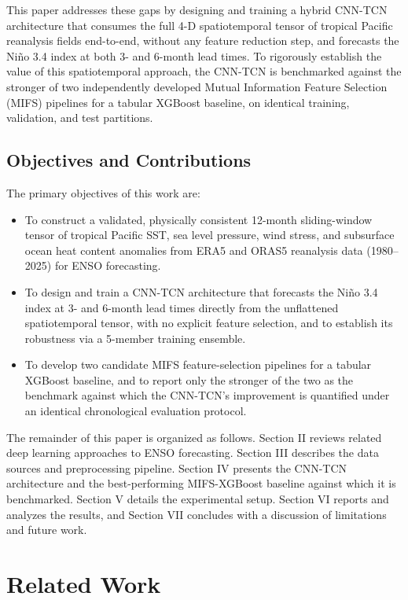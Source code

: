 \documentclass[conference]{IEEEtran}
\begin{document}
This paper addresses these gaps by designing and training a hybrid CNN-TCN architecture that consumes the full 4-D spatiotemporal tensor of tropical Pacific reanalysis fields end-to-end, without any feature reduction step, and forecasts the Ni\~no 3.4 index at both 3- and 6-month lead times. To rigorously establish the value of this spatiotemporal approach, the CNN-TCN is benchmarked against the stronger of two independently developed Mutual Information Feature Selection (MIFS) pipelines for a tabular XGBoost baseline, on identical training, validation, and test partitions.

\subsection{Objectives and Contributions}
The primary objectives of this work are:
\begin{itemize}
\item To construct a validated, physically consistent 12-month sliding-window tensor of tropical Pacific SST, sea level pressure, wind stress, and subsurface ocean heat content anomalies from ERA5 and ORAS5 reanalysis data (1980--2025) for ENSO forecasting.
\item To design and train a CNN-TCN architecture that forecasts the Ni\~no 3.4 index at 3- and 6-month lead times directly from the unflattened spatiotemporal tensor, with no explicit feature selection, and to establish its robustness via a 5-member training ensemble.
\item To develop two candidate MIFS feature-selection pipelines for a tabular XGBoost baseline, and to report only the stronger of the two as the benchmark against which the CNN-TCN's improvement is quantified under an identical chronological evaluation protocol.
\end{itemize}

The remainder of this paper is organized as follows. Section II reviews related deep learning approaches to ENSO forecasting. Section III describes the data sources and preprocessing pipeline. Section IV presents the CNN-TCN architecture and the best-performing MIFS-XGBoost baseline against which it is benchmarked. Section V details the experimental setup. Section VI reports and analyzes the results, and Section VII concludes with a discussion of limitations and future work.

\section{Related Work}
\end{document}
